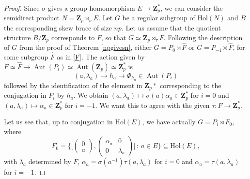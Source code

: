 \documentclass[10pt,a4paper]{amsart}
\newcommand{\Aut}{\operatorname{Aut}}
\newcommand{\Hol}{\mathrm{Hol}}
\newcommand{\Z}{\mathbf Z}
\begin{document}
\begin{proof}
Since $\sigma$ gives a group homomorphism $E\to \Z_p^*$, we can consider the semidirect product $N=\Z_p\rtimes_{\sigma}E$.  Let $G$ be a regular subgroup of $\Hol(N)$ and $B$ the corresponding skew brace of size $np$. Let us assume that the quotient structure $B/\Z_p$ corresponds to $F$, so that $G\simeq \Z_p\rtimes_{\tau} F$. Following the description of $G$ from the proof of Theorem \ref{npgivesn}, either $G=P_0 \rtimes \hat F$ or $G=P_{-1}\rtimes \hat F$, for some subgroup $\hat F$ as in \eqref{F}. The action given by $F\simeq \hat F\to \Aut(P_i)\simeq \Aut(\Z_p)\simeq \Z_p^*$ is 
$$
(a,\lambda_a)\to h_a\to \Phi_{h_a} \in\Aut(P_i)
$$
followed by the identification of the element in $\Z_p*$ corresponding to the conjugation in $P_i$ by $h_a$.
We obtain 
 $(a,\lambda_a) \mapsto \sigma(a)\alpha_a\in\Z_p^*$ for $i=0$ and $(a,\lambda_a) \mapsto \alpha_a\in \Z_p^*$ for $i=-1$. We want this to agree with the given $\tau:F\to \Z_p^*.$

Let us see that, up to conjugation in $\Hol(E)$, we have actually $G=P_i \rtimes F_0$, where
$$F_0=\Big\{\Big[\begin{pmatrix}
		0\\
		a
		\end{pmatrix},\begin{pmatrix}
		\alpha_a & 0\\
		0&\lambda_a
		\end{pmatrix}\Big] \, : \, a \in E\Big\}\subseteq \Hol(E),$$
with $\lambda_a$ determined by $F$, $\alpha_a=\sigma(a^{-1})\tau(a,\lambda_a)$ for $i=0$ and $\alpha_a=\tau(a,\lambda_a)$ for $i=-1$.


\end{proof}
\end{document}
